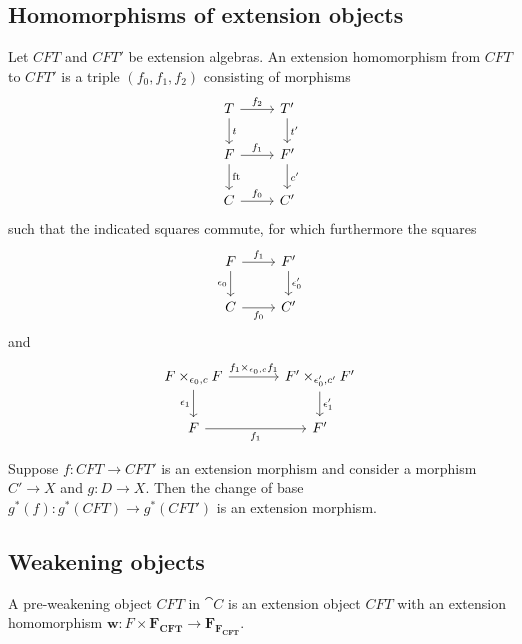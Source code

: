 \subsection{Homomorphisms of extension objects}
\begin{defn}
Let $CFT$ and $CFT'$ be extension algebras. An extension homomorphism from 
$CFT$ to $CFT'$ is a triple $(f_0,f_1,f_2)$ consisting of morphisms
\begin{equation*}
\begin{tikzcd}
T 
  \ar{r}{f_2}
  \ar{d}{t}
  &
T'
  \ar{d}{t'}
  \\
F 
  \ar{r}{f_1}
  \ar{d}{\eft}
  &
F'
  \ar{d}{c'}
  \\
C 
  \ar{r}{f_0}
  &
C'
\end{tikzcd}
\end{equation*}
such that the indicated squares commute, for which furthermore the squares
\begin{equation*}
\begin{tikzcd}
F \ar{r}{f_1}
  \ar{d}[swap]{\epsilon_0}
  &
F'
  \ar{d}{\epsilon_0'}
  \\
C \ar{r}[swap]{f_0}
  &
C'
\end{tikzcd}
\end{equation*}
and
\begin{equation*}
\begin{tikzcd}[column sep=large]
F\times_{\epsilon_0,c} F
  \ar{r}{f_1\times_{\epsilon_0,c} f_1}
  \ar{d}[swap]{\epsilon_1}
  &
F'\times_{\epsilon_0',c'} F'
  \ar{d}{\epsilon_1'}
  \\
F \ar{r}[swap]{f_1}
  &
F'
\end{tikzcd}
\end{equation*}
\end{defn}

\begin{lem}
Suppose $f:CFT\to CFT'$ is an extension morphism and consider a morphism
$C'\to X$ and $g:D\to X$. Then the change of base $g^\ast(f):g^\ast(CFT)\to
g^\ast(CFT')$ is an extension morphism.
\end{lem}

\subsection{Weakening objects}
\begin{defn}
A pre-weakening object $CFT$ in $\cat{C}$ is an extension object $CFT$ with 
an extension homomorphism $\mathbf{w}:F\times\mathbf{F_{CFT}}\to \mathbf{F_{F_{CFT}}}$.
\end{defn}

